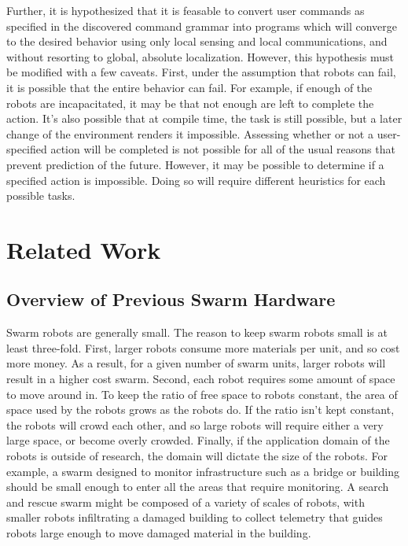 \documentclass[]{article}
\begin{document}
Further, it is hypothesized that it is feasable to convert user commands as specified in the discovered command grammar into programs which will converge to the desired behavior using only local sensing and local communications, and without resorting to global, absolute localization. 
However, this hypothesis must be modified with a few caveats. 
First, under the assumption that robots can fail, it is possible that the entire behavior can fail. 
For example, if enough of the robots are incapacitated, it may be that not enough are left to complete the action. 
It's also possible that at compile time, the task is still possible, but a later change of the environment renders it impossible. 
Assessing whether or not a user-specified action will be completed is not possible for all of the usual reasons that prevent prediction of the future. 
However, it may be possible to determine if a specified action is impossible. 
Doing so will require different heuristics for each possible tasks. 

\section{Related Work}

\subsection{Overview of Previous Swarm Hardware}

Swarm robots are generally small. 
The reason to keep swarm robots small is at least three-fold. 
First, larger robots consume more materials per unit, and so cost more money.
As a result, for a given number of swarm units, larger robots will result in a higher cost swarm. 
Second, each robot requires some amount of space to move around in. 
To keep the ratio of free space to robots constant, the area of space used by the robots grows as the robots do. 
If the ratio isn't kept constant, the robots will crowd each other, and so large robots will require either a very large space, or become overly crowded.
Finally, if the application domain of the robots is outside of research, the domain will dictate the size of the robots. 
For example, a swarm designed to monitor infrastructure such as a bridge or building should be small enough to enter all the areas that require monitoring. 
A search and rescue swarm might be composed of a variety of scales of robots, with smaller robots infiltrating a damaged building to collect telemetry that guides robots large enough to move damaged material in the building. 
\end{document}

